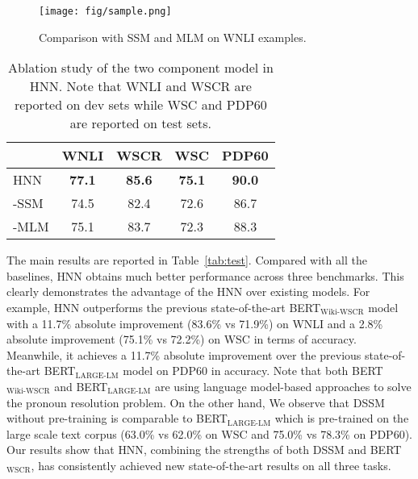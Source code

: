 \documentclass[11pt,a4paper]{article}
\newcommand{\nmodel}{HNN}
\newcommand{\wsc}{WSC}
\begin{document}
\begin{figure*}[ht!]
	\centering

    {
	\texttt{[image: fig/sample.png]}
    }
	\caption{Comparison with SSM and MLM on WNLI examples.}
	\label{fig:sample}
\end{figure*}



\begin{table}[htb!]
	\begin{center}
		\begin{tabular}{@{\hskip1pt}l |c c |c c } \hline
			 &WNLI &WSCR & {\wsc} & PDP60 \\ \hline \hline
            {\nmodel} &{\bf 77.1} & \textbf{85.6} &\bf 75.1 &  \bf 90.0\\\hline
            -SSM & 74.5 & 82.4& 72.6 &  86.7\\\hline
            -MLM &75.1 & 83.7& 72.3 & 88.3\\\hline
		\end{tabular}
	\end{center}
    \caption{Ablation study of the two component model in {\nmodel}. Note that WNLI and WSCR are reported on dev sets while WSC and PDP60 are reported on test sets.}
	\label{tab:mlm_ssm}
\end{table}












The main results are reported in Table~\ref{tab:test}. Compared with all the baselines, {\nmodel} obtains much better performance across three benchmarks. 
This clearly demonstrates the advantage of the {\nmodel} over existing models. 
For example, {\nmodel} outperforms the previous state-of-the-art BERT$_{\text{Wiki-WSCR}}$ model with a 11.7\% absolute improvement (83.6\% vs 71.9\%) on WNLI and a 2.8\% absolute improvement (75.1\% vs 72.2\%) on {\wsc} in terms of accuracy.
Meanwhile, it achieves a 11.7\% absolute improvement over the previous state-of-the-art BERT$_{\text{LARGE-LM}}$ model on PDP60 in accuracy. 
Note that both BERT$_{\text{Wiki-WSCR}}$ and BERT$_{\text{LARGE-LM}}$ are using language model-based approaches to solve the pronoun resolution problem. 
On the other hand, We observe that DSSM without pre-training is comparable to BERT$_{\text{LARGE-LM}}$ which is pre-trained on the large scale text corpus (63.0\% vs 62.0\% on WSC and 75.0\% vs 78.3\% on PDP60). Our results show that {\nmodel}, combining the strengths of both DSSM and BERT$_{\text{WSCR}}$, has consistently achieved new state-of-the-art results on all three tasks.
\end{document}
